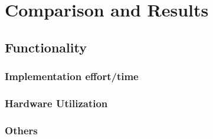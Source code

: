 \chapter{Comparison and Results}
\label{cha:ComparisonAndResults}
  \section{Functionality}
  \subsection{Implementation effort/time}
  \subsection{Hardware Utilization}
  \subsection{Others}

